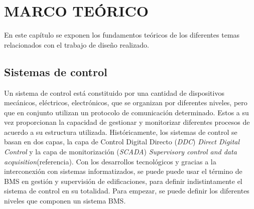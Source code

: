 \chapter{MARCO TEÓRICO}
\thispagestyle{empty}

\abovedisplayskip=0pt
\belowdisplayskip=10pt
\abovedisplayshortskip=0pt
\belowdisplayshortskip=10pt

En este capítulo se exponen los fundamentos teóricos de los diferentes temas relacionados con el trabajo de diseño realizado. 

\section{Sistemas de control}
Un sistema de control está constituido por una cantidad de dispositivos mecánicos, eléctricos, electrónicos, que se organizan por diferentes niveles, pero que en conjunto utilizan un protocolo de comunicación determinado. Estos a su vez proporcionan la capacidad de gestionar y monitorizar diferentes procesos de acuerdo a su estructura utilizada. Históricamente, los sistemas de control se basan en dos capas, la capa de Control Digital Directo (\textit{DDC}) \textit{Direct Digital Control} y la capa de monitorización (\textit{SCADA}) \textit{Supervisory control and data acquisition}(referencia). Con los desarrollos tecnológicos y gracias a la interconexión con sistemas informatizados, se puede puede usar el término de BMS en gestión y supervisión de edificaciones, para definir indistintamente el sistema de control en su totalidad. Para empezar, se puede definir los diferentes niveles que componen un sistema BMS.


